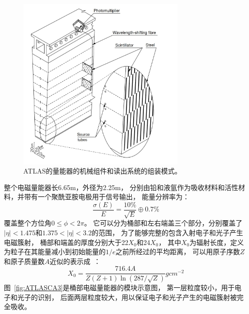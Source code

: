 \begin{figure}
  \begin{center}
    \includegraphics[width=0.75\textwidth]{figuresEXP/ATLASCA2.jpg}
  \end{center}
  \caption{
\textsc{ATLAS}的量能器的机械组件和读出系统的组装模式。
  }
    \label{fig:ATLASCA2}
\end{figure}

整个电磁量能器长6.65m，外径为2.25m，
分别由铅和液氩作为吸收材料和活性材料，并带有一个聚酰亚胺电极用于信号输出，
能量分辨率为：
\begin{equation} 
\label{eq:EMsigma1}
\frac{\sigma(E)}{E}=\frac{10\%}{\sqrt{E}}\oplus 0.7\%
\end{equation}
覆盖整个方位角$0\le\phi<2\pi$。
它可以分为桶部和左右端盖三个部分，分别覆盖了$|\eta|<1.475$和$1.375<|\eta|<3.2$的范围，
为了能够完整的包含入射电子和光子产生电磁簇射，
桶部和端盖的厚度分别大于22$X_0$和24$X_0$，
其中$X_0$为辐射长度，定义为粒子在其能量减小到初始能量的$1/e$之前所经过的平均距离，
可以用原子序数$Z$和原子质量数$A$近似的表示成~\cite{PDG}：
\begin{equation} 
\label{eq:X0def}
X_0=\frac{716.4A}{Z(Z+1)\ln(287/\sqrt{Z})}g cm^{-2}
\end{equation}
图~\ref{fig:ATLASCA3}是桶部电磁量能器的模块示意图，
第一层粒度较小，用于电子和光子的识别，
后面两层粒度较大，用以保证电子和光子产生的电磁簇射被完全吸收。

